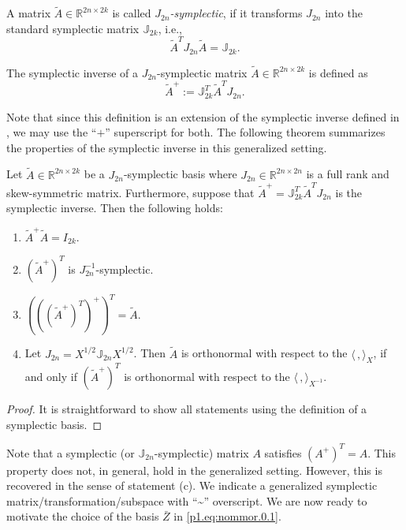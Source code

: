 \begin{definition}
A matrix $\tilde A\in \mathbb R^{2n\times 2k}$ is called \emph{$J_{2n}$-symplectic}, if it transforms $J_{2n}$ into the standard symplectic matrix $\mathbb J_{2k}$, i.e.,
\begin{equation} \label{p1.eq:nommor.0.3}
	\tilde A^T J_{2n} \tilde A = \mathbb J_{2k}.
\end{equation}
\end{definition}

\begin{definition}
The symplectic inverse of a $J_{2n}$-symplectic matrix $\tilde A\in \mathbb R^{2n\times 2k}$ is defined as
\begin{equation} \label{p1.eq:nommor.0.4}
	\tilde A^{+} := \mathbb J_{2k}^T \tilde A^T J_{2n}.
\end{equation}
\end{definition}
Note that since this definition is an extension of the symplectic inverse defined in \cite{doi:10.1137/140978922}, we may use the ``$+$'' superscript for both. The following theorem summarizes the properties of the symplectic inverse in this generalized setting.

\begin{proposition} \label{thm:4.1}
Let $\tilde A\in \mathbb R^{2n\times 2k}$ be a $J_{2n}$-symplectic basis where $J_{2n}\in\mathbb R^{2n\times 2n}$ is a full rank and skew-symmetric matrix. Furthermore, suppose that $\tilde A^{+} = \mathbb{J}_{2k}^T \tilde A^T J_{2n}$ is the symplectic inverse. Then the following holds:
\begin{enumerate}[$\qquad$(a)]
\item $\tilde A^+ \tilde A = I_{2k}$.
\item $(\tilde A^+)^T$ is $J_{2n}^{-1}$-symplectic.
\item $\left(\left(\left(\tilde A^+\right)^T\right)^+\right)^T = \tilde A$.
\item Let $J_{2n}=X^{1/2}\mathbb J_{2n} X^{1/2}$. Then $\tilde A$ is orthonormal with respect to the $\langle\,,\rangle_X$, if and only if $(\tilde A^+)^T$ is orthonormal with respect to the $\langle\,,\rangle_{X^{-1}}$.
\end{enumerate}
\end{proposition}
\begin{proof}
It is straightforward to show all statements using the definition of a symplectic basis.
\end{proof}

Note that a symplectic (or $\mathbb J_{2n}$-symplectic) matrix $A$ satisfies $(A^+)^T = A$. This property does not, in general, hold in the generalized setting. However, this is recovered in the sense of statement (c). We indicate a generalized symplectic matrix/transformation/subspace with ``\textasciitilde'' overscript. We are now ready to motivate the choice of the basis $\bar Z$ in \eqref{p1.eq:nommor.0.1}.

